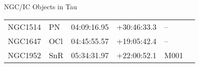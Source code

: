 \begin{block}{NGC/IC Objects in Tau}
  \centering
  \begin{tabularx}{\textwidth}{llrrll} \toprule 
    NGC1514 & PN & 04:09:16.95 & +30:46:33.3  & -- \\ 
    NGC1647 & OCl & 04:45:55.57 & +19:05:42.4  & -- \\ 
    NGC1952 & SnR & 05:34:31.97 & +22:00:52.1  & M001 \\ 
  \end{tabularx}
\end{block}